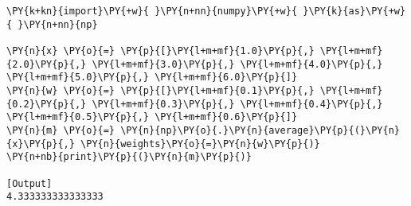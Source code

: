 \begin{Verbatim}[label=\makebox{\href{https://github.com/unipi-physics-labs/lab1-notes/tree/main/snippy/np.average.py}{https://github.com/.../np.average.py}},commandchars=\\\{\}]
\PY{k+kn}{import}\PY{+w}{ }\PY{n+nn}{numpy}\PY{+w}{ }\PY{k}{as}\PY{+w}{ }\PY{n+nn}{np}

\PY{n}{x} \PY{o}{=} \PY{p}{[}\PY{l+m+mf}{1.0}\PY{p}{,} \PY{l+m+mf}{2.0}\PY{p}{,} \PY{l+m+mf}{3.0}\PY{p}{,} \PY{l+m+mf}{4.0}\PY{p}{,} \PY{l+m+mf}{5.0}\PY{p}{,} \PY{l+m+mf}{6.0}\PY{p}{]}
\PY{n}{w} \PY{o}{=} \PY{p}{[}\PY{l+m+mf}{0.1}\PY{p}{,} \PY{l+m+mf}{0.2}\PY{p}{,} \PY{l+m+mf}{0.3}\PY{p}{,} \PY{l+m+mf}{0.4}\PY{p}{,} \PY{l+m+mf}{0.5}\PY{p}{,} \PY{l+m+mf}{0.6}\PY{p}{]}
\PY{n}{m} \PY{o}{=} \PY{n}{np}\PY{o}{.}\PY{n}{average}\PY{p}{(}\PY{n}{x}\PY{p}{,} \PY{n}{weights}\PY{o}{=}\PY{n}{w}\PY{p}{)}
\PY{n+nb}{print}\PY{p}{(}\PY{n}{m}\PY{p}{)}

[Output]
4.333333333333333
\end{Verbatim}
